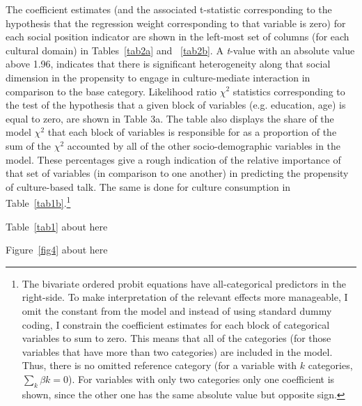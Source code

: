 \documentclass[11pt]{article}
\begin{document}
The coefficient estimates (and the associated t-statistic corresponding to the hypothesis that the regression weight corresponding to that variable is zero) for each social position indicator are shown in the left-most set of columns (for each cultural domain) in Tables~\ref{tab2a} and ~\ref{tab2b}.  A \emph{t}-value with an absolute value above 1.96, indicates that there is significant heterogeneity along that social dimension in the propensity to engage in culture-mediate interaction in comparison to the base category. Likelihood ratio $\chi^{2}$ statistics corresponding to the test of the hypothesis that a given block of variables (e.g. education, age) is equal to zero, are shown in Table 3a. The table also displays the share of the model $\chi^{2}$ that each block of variables is responsible for as a proportion of the sum of the $\chi^{2}$ accounted by all of the other socio-demographic variables in the model.  These percentages give a rough indication of the relative importance of that set of variables (in comparison to one another) in predicting the propensity of culture-based talk. The same is done for culture consumption in Table~\ref{tab1b}.\footnote{The bivariate ordered probit equations have all-categorical predictors in the right-side.  To make interpretation of the relevant effects more manageable, I omit the constant from the model and instead of using standard dummy coding, I constrain the coefficient estimates for each block of categorical variables to sum to zero.  This means that all of the categories (for those variables that have more than two categories) are included in the model.  Thus, there is no omitted reference category  (for a variable with $k$ categories, $\sum_{k}\beta{k}=0$). For variables with only two categories only one coefficient is shown, since the other one has the same absolute value but opposite sign.}



\begin{center}
	Table~\ref{tab1} about here
\end{center}

\begin{center}
	Figure~\ref{fig4} about here
\end{center}
\end{document}
